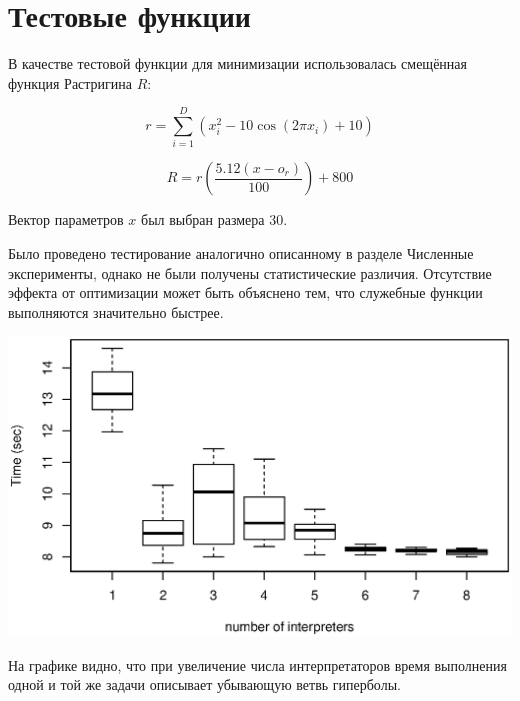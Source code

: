 \section*{Тестовые функции}

В качестве тестовой функции для минимизации
использовалась смещённая функция Растригина $R$:

\begin{equation}
    r = \sum_{i = 1}^{D}(x_i^2 - 10\cos(2 \pi x_i) + 10)
\end{equation}

\begin{equation}
    R = r\left(\frac{5.12 (x - o_r)}{100}\right) + 800
\end{equation}

Вектор параметров $x$ был выбран размера 30.

Было проведено тестирование
аналогично описанному в разделе
Численные эксперименты,
однако не были получены
статистические различия.
Отсутствие эффекта
от оптимизации может
быть объяснено тем,
что служебные функции
выполняются значительно быстрее.

\begin{center}
\includegraphics{rastrigin}
\end{center}

На графике видно,
что при увеличение числа интерпретаторов
время выполнения одной и той же задачи
описывает убывающую ветвь гиперболы.


